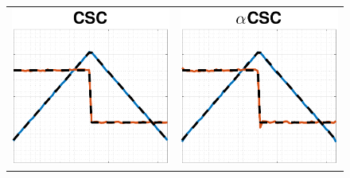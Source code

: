 \begin{figure}[t]
\begin{center}
{\begin{tabular}{c c}
        \\
        \includegraphics[width=\tmpsize\linewidth]{figures/synth_1_1_v2.pdf} &
        \includegraphics[width=\tmpsize\linewidth]{figures/synth_1_2_v2.pdf}

\end{tabular}}
\end{center}
\end{figure}
